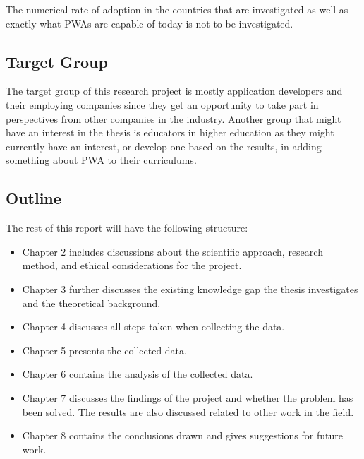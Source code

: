 \documentclass[a4paper,12pt]{article}
\begin{document}
The numerical rate of adoption in the countries that are investigated as well as exactly what PWAs are capable of today is not to be investigated.

\subsection{Target Group}
\label{Intro_targetGroup}
The target group of this research project is mostly application developers and their employing companies since they get an opportunity to take part in perspectives from other companies in the industry. Another group that might have an interest in the thesis is educators in higher education as they might currently have an interest, or develop one based on the results, in adding something about PWA to their curriculums.

\subsection{Outline}
\label{Intro_outlin}
The rest of this report will have the following structure:
\begin{itemize}
    \item Chapter 2 includes discussions about the scientific approach, research method, and ethical considerations for the project.
    \item Chapter 3 further discusses the existing knowledge gap the thesis investigates and the theoretical background.
    \item Chapter 4 discusses all steps taken when collecting the data.
    \item Chapter 5 presents the collected data.
    \item Chapter 6 contains the analysis of the collected data.
    \item Chapter 7 discusses the findings of the project and whether the problem has been solved. The results are also discussed related to other work in the field.
    \item Chapter 8 contains the conclusions drawn and gives suggestions for future work.
\end{itemize}

\newpage
\end{document}
